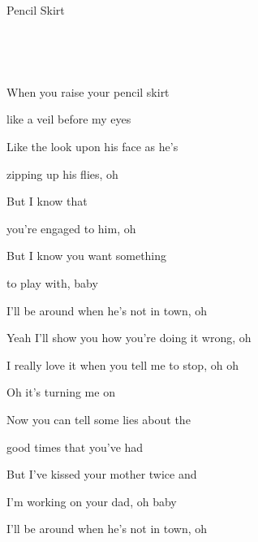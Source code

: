 \begin{song}{Pencil Skirt}{
	

	\mbox{ \CMaj \AMaj \DMaj \GMaj }


	\mbox{ \EmShAm \CMajShE \DMajShA \GMajShE}
	
}

\begin{SongVerse}

 When you raise your pencil skirt 


 like a veil before my eyes

 
 Like the look upon his face as he's

 
 zipping up his flies, oh


 But I know that


 you're engaged to him, oh 


But I   know you want something 


to play with, baby

\end{SongVerse}

\begin{SongVerse}

 I'll be around when he's not in town, oh 


 Yeah I'll show you how you're doing it wrong, oh 


 I really love it when you tell me to stop, oh oh 
                
 
 Oh it's turning me on

\end{SongVerse}

\begin{SongVerse}

 Now you can tell some lies about the


good times that you've had


But I've kissed your mother twice and


I'm working on your dad, oh baby


\end{SongVerse}

\begin{SongVerse}

 I'll be around when he's not in town, oh 



\end{SongVerse}
\end{song}
